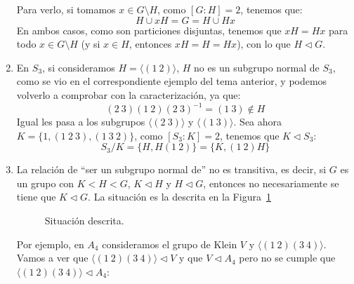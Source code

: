 \begin{ejemplo}
\begin{enumerate}
            Para verlo, si tomamos $x\in G\setminus H$, como $[G:H] = 2$, tenemos que:
                \begin{equation*}
                    H\cup xH = G = H\cup Hx
                \end{equation*}
                En ambos casos, como son particiones disjuntas, tenemos que $xH = Hx$ para todo $x\in G\setminus H$ (y si $x\in H$, entonces $xH = H = Hx$), con lo que $H\lhd G$.
        \item En $S_3$, si consideramos $H = \langle (1\ 2) \rangle $, $H$ no es un subgrupo normal de $S_3$, como se vio en el correspondiente ejemplo del tema anterior, y podemos volverlo a comprobar con la caracterización, ya que:
            \begin{equation*}
                (2\ 3)(1\ 2){(2\ 3)}^{-1} = (1\ 3)\notin H
            \end{equation*}
            Igual les pasa a los subgrupos $\langle (2\ 3) \rangle $ y $\langle (1\ 3) \rangle $. Sea ahora $K = \{1, (1\ 2\ 3), (1\ 3\ 2)\}$, como $[S_3:K]=2$, tenemos que $K\lhd S_3$:
            \begin{equation*}
                S_3 / K = \{H, H(1\ 2)\} = \{K, (1\ 2)H\}
            \end{equation*}
        \item La relación de ``ser un subgrupo normal de'' no es transitiva, es decir, si $G$ es un grupo con $K<H<G$, $K\lhd H$ y $H\lhd G$, entonces no necesariamente se tiene que $K\lhd G$. La situación es la descrita en la Figura~\ref{fig:situacion}
            \begin{figure}[H]
                \centering
                \caption{Situación descrita.}
                \label{fig:situacion}
            \end{figure}

            Por ejemplo, en $A_4$ consideramos el grupo de Klein $V$ y $\langle (1\ 2)(3\ 4) \rangle $. Vamos a ver que $\langle (1\ 2)(3\ 4) \rangle \lhd V$ y que $V \lhd A_4 $ pero no se cumple que $\langle (1\ 2)(3\ 4) \rangle \lhd A_4 $:
            \begin{figure}[H]
                \centering
\end{figure}
\end{enumerate}
\end{ejemplo}
